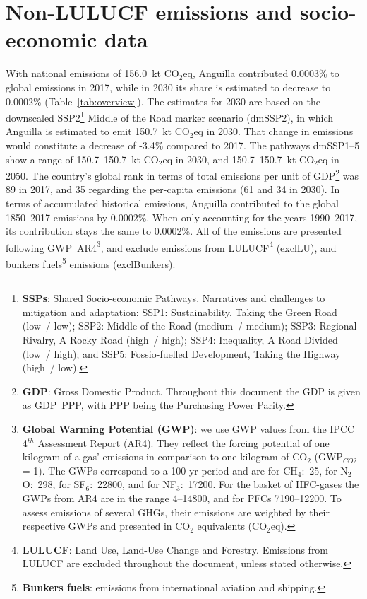 \documentclass[12pt]{article}
\begin{document}
 \section{Non-LULUCF emissions and socio-economic data}
 \label{sec:nonLULUCFSocioEco}
 With national emissions of 156.0~kt CO$_2$eq, Anguilla contributed 0.0003\% to global emissions in 2017, while in 2030 its share is estimated to decrease to 0.0002\% (Table~\ref{tab:overview}).
 The estimates for 2030 are based on the downscaled SSP2\footnote{\textbf{SSPs}: Shared Socio-economic Pathways.
 Narratives and challenges to mitigation and adaptation: 
 SSP1: Sustainability, Taking the Green Road (low~/ low);
 SSP2: Middle of the Road (medium~/ medium);
 SSP3: Regional Rivalry, A Rocky Road (high~/ high);
 SSP4: Inequality, A Road Divided (low~/ high); and
 SSP5: Fossio-fuelled Development, Taking the Highway (high~/ low).} Middle of the Road marker scenario (dmSSP2), in which Anguilla is estimated to emit 150.7~kt CO$_2$eq in 2030.
 That change in emissions would constitute a decrease of -3.4\% compared to 2017. 
 The pathways dmSSP1--5 show a range of 150.7--150.7~kt CO$_2$eq in 2030, and 150.7--150.7~kt CO$_2$eq in 2050.
 The country's global rank in terms of total emissions per unit of GDP\footnote{\textbf{GDP}: Gross Domestic Product. 
 Throughout this document the GDP is given as GDP~PPP, with PPP being the Purchasing Power Parity.} was 89 in 2017, and 35 regarding the per-capita emissions (61 and 34 in 2030).
 In terms of accumulated historical emissions, Anguilla contributed to the global 1850--2017 emissions by 0.0002\%. 
 When only accounting for the years 1990--2017, its contribution stays the same to 0.0002\%.
 All of the emissions are presented following GWP~AR4\footnote{\textbf{Global Warming Potential (GWP)}: we use GWP values from the IPCC 4$^{th}$ Assessment Report (AR4). 
 They reflect the forcing potential of one kilogram of a gas' emissions in comparison to one kilogram of CO$_2$ (GWP$_{CO2}$ = 1). 
 The GWPs correspond to a 100-yr period and are for CH$_4$:~25, for N$_2$O:~298, for SF$_6$:~22800, and for NF$_3$:~17200. 
 For the basket of HFC-gases the GWPs from AR4 are in the range 4--14800, and for PFCs 7190--12200. 
 To assess emissions of several GHGs, their emissions are weighted by their respective GWPs and presented in CO$_2$ equivalents (CO$_2$eq).}, and exclude emissions from LULUCF\footnote{\textbf{LULUCF}: Land Use, Land-Use Change and Forestry. 
 Emissions from LULUCF are excluded throughout the document, unless stated otherwise.} (exclLU), and bunkers fuels\footnote{\textbf{Bunkers fuels}: emissions from international aviation and shipping.} emissions (exclBunkers).
\end{document}
